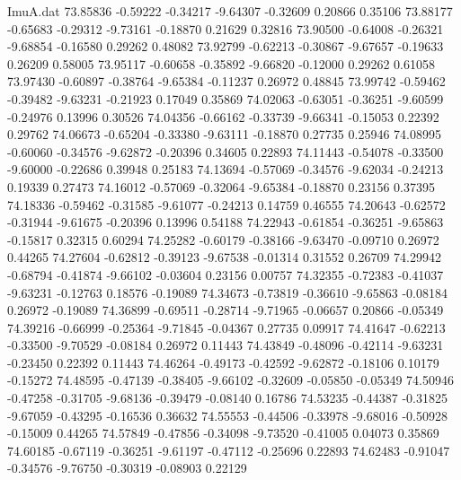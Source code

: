 \begin{filecontents}{ImuA.dat}
  73.85836   -0.59222   -0.34217   -9.64307   -0.32609    0.20866    0.35106
  73.88177   -0.65683   -0.29312   -9.73161   -0.18870    0.21629    0.32816
  73.90500   -0.64008   -0.26321   -9.68854   -0.16580    0.29262    0.48082
  73.92799   -0.62213   -0.30867   -9.67657   -0.19633    0.26209    0.58005
  73.95117   -0.60658   -0.35892   -9.66820   -0.12000    0.29262    0.61058
  73.97430   -0.60897   -0.38764   -9.65384   -0.11237    0.26972    0.48845
  73.99742   -0.59462   -0.39482   -9.63231   -0.21923    0.17049    0.35869
  74.02063   -0.63051   -0.36251   -9.60599   -0.24976    0.13996    0.30526
  74.04356   -0.66162   -0.33739   -9.66341   -0.15053    0.22392    0.29762
  74.06673   -0.65204   -0.33380   -9.63111   -0.18870    0.27735    0.25946
  74.08995   -0.60060   -0.34576   -9.62872   -0.20396    0.34605    0.22893
  74.11443   -0.54078   -0.33500   -9.60000   -0.22686    0.39948    0.25183
  74.13694   -0.57069   -0.34576   -9.62034   -0.24213    0.19339    0.27473
  74.16012   -0.57069   -0.32064   -9.65384   -0.18870    0.23156    0.37395
  74.18336   -0.59462   -0.31585   -9.61077   -0.24213    0.14759    0.46555
  74.20643   -0.62572   -0.31944   -9.61675   -0.20396    0.13996    0.54188
  74.22943   -0.61854   -0.36251   -9.65863   -0.15817    0.32315    0.60294
  74.25282   -0.60179   -0.38166   -9.63470   -0.09710    0.26972    0.44265
  74.27604   -0.62812   -0.39123   -9.67538   -0.01314    0.31552    0.26709
  74.29942   -0.68794   -0.41874   -9.66102   -0.03604    0.23156    0.00757
  74.32355   -0.72383   -0.41037   -9.63231   -0.12763    0.18576   -0.19089
  74.34673   -0.73819   -0.36610   -9.65863   -0.08184    0.26972   -0.19089
  74.36899   -0.69511   -0.28714   -9.71965   -0.06657    0.20866   -0.05349
  74.39216   -0.66999   -0.25364   -9.71845   -0.04367    0.27735    0.09917
  74.41647   -0.62213   -0.33500   -9.70529   -0.08184    0.26972    0.11443
  74.43849   -0.48096   -0.42114   -9.63231   -0.23450    0.22392    0.11443
  74.46264   -0.49173   -0.42592   -9.62872   -0.18106    0.10179   -0.15272
  74.48595   -0.47139   -0.38405   -9.66102   -0.32609   -0.05850   -0.05349
  74.50946   -0.47258   -0.31705   -9.68136   -0.39479   -0.08140    0.16786
  74.53235   -0.44387   -0.31825   -9.67059   -0.43295   -0.16536    0.36632
  74.55553   -0.44506   -0.33978   -9.68016   -0.50928   -0.15009    0.44265
  74.57849   -0.47856   -0.34098   -9.73520   -0.41005    0.04073    0.35869
  74.60185   -0.67119   -0.36251   -9.61197   -0.47112   -0.25696    0.22893
  74.62483   -0.91047   -0.34576   -9.76750   -0.30319   -0.08903    0.22129

\end{filecontents}
